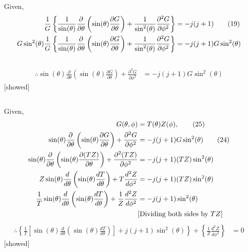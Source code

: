\documentclass{article}
\begin{document}
\large{
Given,
\begin{align}
    \frac{1}{G} \left\{ \frac{1}{\sin(\theta)} \frac{\partial}{\partial\theta} \left( \sin(\theta) \frac{\partial G}{\partial\theta} \right) + \frac{1}{\sin^2 (\theta)} \frac{\partial^2 G}{\partial \phi^2} \right\}		& = -j(j+1) \tag{19}\\
    G\sin^2 (\theta)\frac{1}{G} \left\{ \frac{1}{\sin(\theta)} \frac{\partial}{\partial\theta} \left( \sin(\theta) \frac{\partial G}{\partial\theta} \right) + \frac{1}{\sin^2 (\theta)} \frac{\partial^2 G}{\partial \phi^2} \right\}		& = -j(j+1) G\sin^2 (\theta) \notag
\end{align}
\hspace{10cm}\\
\begin{align}
    \therefore \sin(\theta) \frac{\partial}{\partial\theta} \left( \sin(\theta) \frac{\partial G}{\partial\theta} \right) + \frac{\partial^2 G}{\partial \phi^2}		& = -j(j+1) G\sin^2 (\theta) \tag{24}
\end{align}
\hspace{12cm}[showed]
}



\subsection{}%
\large{
Given,
\begin{align}
    G(\theta, \phi)		&= T(\theta) Z(\phi), \tag{25}\\
    \sin(\theta) \frac{\partial}{\partial\theta} \left( \sin(\theta) \frac{\partial G}{\partial\theta} \right) + \frac{\partial^2 G}{\partial \phi^2}		& = -j(j+1) G\sin^2 (\theta) \tag{24}\\
    \sin(\theta) \frac{\partial}{\partial\theta} \left( \sin(\theta) \frac{\partial (T Z)}{\partial\theta} \right) + \frac{\partial^2 (T Z)}{\partial \phi^2}		& = -j(j+1) (T Z)\sin^2 (\theta) \notag\\
    Z\sin(\theta) \frac{d}{d\theta} \left( \sin(\theta) \frac{d T}{d\theta} \right) + T\frac{d^2 Z}{d \phi^2}		& = -j(j+1) (T Z)\sin^2 (\theta) \notag\\
    \frac{1}{T}\sin(\theta) \frac{d}{d\theta} \left( \sin(\theta) \frac{d T}{d\theta} \right) + \frac{1}{Z}\frac{d^2 Z}{d \phi^2}		& = -j(j+1) \sin^2 (\theta)\notag \\
                                                                                                                                    & \text{[Dividing both sides by $TZ$]}\notag
\end{align}
\begin{align}
    \therefore \left\{ \frac{1}{T} \left[ \sin(\theta) \frac{d}{d\theta} \left( \sin(\theta) \frac{d T}{d\theta} \right) \right] + j(j+1) \sin^2 (\theta) \right\} + \left\{ \frac{1}{Z}\frac{d^2 Z}{d \phi^2} \right\}		& = 0 \tag{26}
\end{align}
\hspace{12cm}[showed]

}
\end{document}
